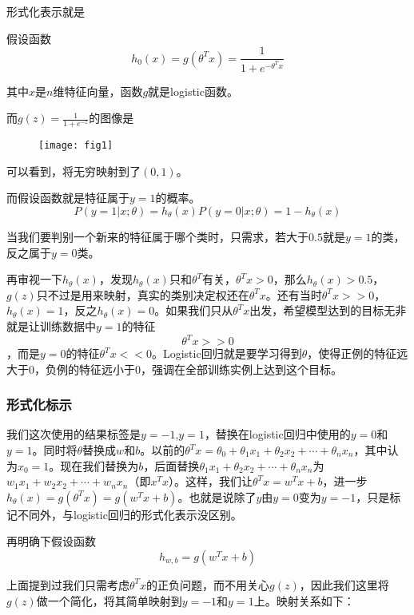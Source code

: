 \documentclass[a4paper,12pt]{article}
\begin{document}
形式化表示就是

假设函数
\begin{equation}
h_0(x)=g(\theta^Tx)=\frac{1}{1+e^{-\theta^Tx}}
\end{equation}

其中$x$是$n$维特征向量，函数$g$就是logistic函数。

而$g(z)=\frac{1}{1+e^{-z}}$的图像是

\begin{figure}[H]
\centering
\texttt{[image: fig1]}
\end{figure}

可以看到，将无穷映射到了$(0,1)$。

而假设函数就是特征属于$y=1$的概率。
\begin{equation}
P(y=1|x;\theta)=h_\theta(x)
P(y=0|x;\theta)=1-h_\theta(x)
\end{equation}

当我们要判别一个新来的特征属于哪个类时，只需求，若大于$0.5$就是$y=1$的类，反之属于$y=0$类。

再审视一下$h_\theta(x)$，发现$h_\theta(x)$只和$ \theta^T $有关，$\theta^Tx>0$，那么$h_\theta(x)>0.5$，$g(z)$只不过是用来映射，真实的类别决定权还在$\theta^Tx$。还有当时$\theta^Tx>>0$，$h_\theta(x)=1$，反之$h_\theta(x)=0$。如果我们只从$\theta^Tx$出发，希望模型达到的目标无非就是让训练数据中$y=1$的特征$$\theta^Tx>>0$$，而是$y=0$的特征$\theta^Tx<<0$。Logistic回归就是要学习得到$\theta$，使得正例的特征远大于$0$，负例的特征远小于$0$，强调在全部训练实例上达到这个目标。

\subsubsection{形式化标示}
我们这次使用的结果标签是$y=-1$,$y=1$，替换在logistic回归中使用的$y=0$和$y=1$。同时将$\theta$替换成$w$和$b$。以前的$\theta^Tx=\theta_0+\theta_1x_1+\theta_2x_2+\cdots+\theta_nx_n$，其中认为$x_0=1$。现在我们替换为$b$，后面替换$\theta_1x_1+\theta_2x_2+\cdots+\theta_nx_n$为$w_1x_1+w_2x_2+\cdots+w_nx_n$（即$x^Tx$）。这样，我们让$\theta^Tx=w^Tx+b$，进一步$h_\theta(x)=g(\theta^Tx)=g(w^Tx+b)$。也就是说除了$y$由$y=0$变为$y=-1$，只是标记不同外，与logistic回归的形式化表示没区别。

再明确下假设函数
\begin{equation}
h_{w,b}=g(w^Tx+b)
\end{equation}

上面提到过我们只需考虑$\theta^Tx$的正负问题，而不用关心$g(z)$，因此我们这里将$g(z)$做一个简化，将其简单映射到$y=-1$和$y=1$上。映射关系如下：
\end{document}
